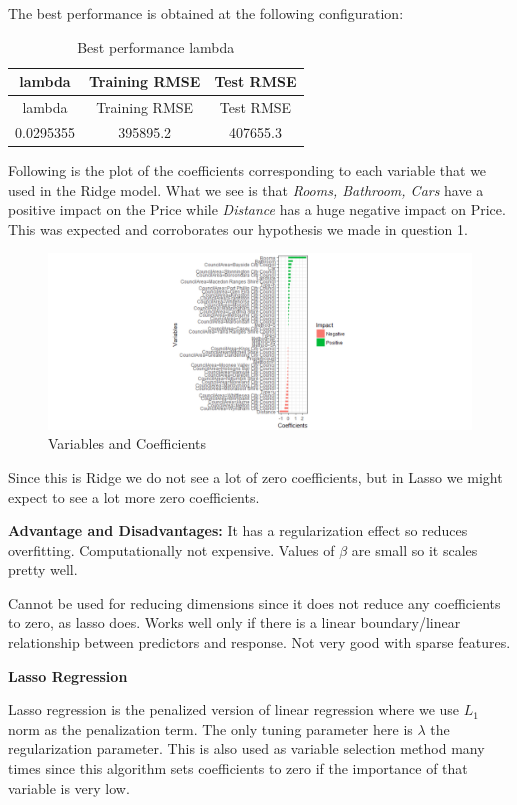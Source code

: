 \documentclass[]{article}
\begin{document}
The best performance is obtained at the following configuration:

\begin{longtable}[]{@{}ccc@{}}
\caption{Best performance lambda}\tabularnewline
\toprule
lambda & Training RMSE & Test RMSE\tabularnewline
\midrule
\endfirsthead
\toprule
lambda & Training RMSE & Test RMSE\tabularnewline
\midrule
\endhead
0.0295355 & 395895.2 & 407655.3\tabularnewline
\bottomrule
\end{longtable}

Following is the plot of the coefficients corresponding to each variable
that we used in the Ridge model. What we see is that \emph{Rooms,
Bathroom, Cars} have a positive impact on the Price while
\emph{Distance} has a huge negative impact on Price. This was expected
and corroborates our hypothesis we made in question 1.

\begin{figure}
\centering
\includegraphics{Report_files/figure-latex/unnamed-chunk-16-1.pdf}
\caption{Variables and Coefficients}
\end{figure}

Since this is Ridge we do not see a lot of zero coefficients, but in
Lasso we might expect to see a lot more zero coefficients.

\textbf{Advantage and Disadvantages:} It has a regularization effect so
reduces overfitting. Computationally not expensive. Values of \(\beta\)
are small so it scales pretty well.

Cannot be used for reducing dimensions since it does not reduce any
coefficients to zero, as lasso does. Works well only if there is a
linear boundary/linear relationship between predictors and response. Not
very good with sparse features.

\textbf{Lasso Regression}

Lasso regression is the penalized version of linear regression where we
use \(L_1\) norm as the penalization term. The only tuning parameter
here is \(\lambda\) the regularization parameter. This is also used as
variable selection method many times since this algorithm sets
coefficients to zero if the importance of that variable is very low.
\end{document}
